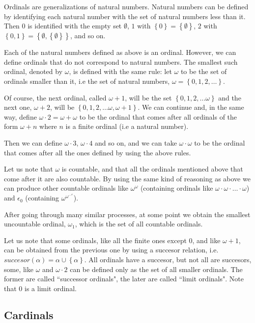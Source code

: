 \documentclass[a4paper
,draft
]{article}
\newcommand{\multime}[1]{\left\{ #1 \right\}}
\newcommand{\ghilimele}[1]{``#1"}
\begin{document}
Ordinals are generalizations of natural numbers. Natural numbers can be
defined by identifying each natural number with the set of natural numbers less
than it. Then $0$ is identified with the empty set $\emptyset$,
$1$ with $\multime{0}=\multime{\emptyset}$,
$2$ with $\multime{0, 1}=\multime{\emptyset, \multime{\emptyset}}$,
and so on.

Each of the natural numbers defined as above is an ordinal.
However, we can define ordinals that do not correspond to natural numbers.
The smallest such ordinal, denoted by $\omega$, is defined with the same rule:
let $\omega$ to be the set of ordinals smaller than it, i.e
the set of natural numbers, $\omega=\multime{0, 1, 2, \dots}$.

Of course, the next ordinal, called $\omega + 1$, will be the set
$\multime{0, 1, 2, \dots \omega}$ and the next one,
$\omega+2$, will be $\multime{0, 1, 2, \dots \omega, \omega+1}$. We can
continue and, in the same way, define $\omega\cdot 2=\omega+\omega$ to be
the ordinal that comes after all ordinals of the form $\omega+n$
where $n$ is a finite ordinal (i.e a natural number).

Then we can define $\omega\cdot 3$, $\omega\cdot 4$ and so on, and we can
take $\omega\cdot \omega$ to be the ordinal that comes after all the ones
defined by using the above rules.

Let us note that $\omega$ is countable, and that all the ordinals mentioned
above that come after it are also countable.
By using the same kind of
reasoning as above we can produce other countable ordinals like
$\omega^\omega$ (containing ordinals like $\omega\cdot\omega\cdot\dots\cdot\omega$)
and $\epsilon_0$ (containing $\omega^{\omega^{\cdots^\omega}}$).

After going through many similar processes, at some point we obtain the
smallest uncountable ordinal, $\omega_1$, which is the set of all
countable ordinals.

Let us note that some ordinals, like all the finite ones except $0$,
and like $\omega+1$, can be obtained from the previous one by using
a succesor relation, i.e. $succesor(\alpha) = \alpha\cup\multime{\alpha}$.
All ordinals have a succesor, but not all are succesors, some, like
$\omega$ and $\omega\cdot 2$ can be defined only as the set of all
smaller ordinals. The former are called \ghilimele{successor ordinals},
the later are called \ghilimele{limit ordinals}. Note that $0$ is a limit
ordinal.

\subsection{Cardinals}
\label{sec:cardinals}
\end{document}
